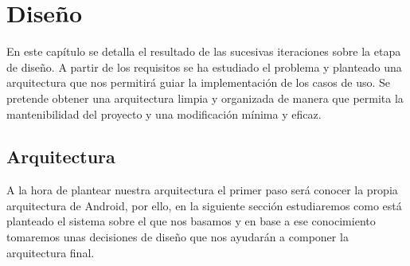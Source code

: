 \documentclass[12pt,a4paper,oneside]{book} %
\begin{document}
\chapter{Diseño}
En este capítulo se detalla el resultado de las sucesivas iteraciones sobre la etapa de diseño. A partir de los requisitos se ha estudiado el problema y planteado una arquitectura que nos permitirá guiar la implementación de los casos de uso. Se pretende obtener una arquitectura limpia y organizada de manera que permita la mantenibilidad del proyecto y una modificación mínima y eficaz. 
\newpage
\section{Arquitectura}
A la hora de plantear nuestra arquitectura el primer paso será conocer la propia arquitectura de Android, por ello, en la siguiente sección estudiaremos como está planteado el sistema sobre el que nos basamos y en base a ese conocimiento tomaremos unas decisiones de diseño que nos ayudarán a componer la arquitectura final. 
\end{document}
